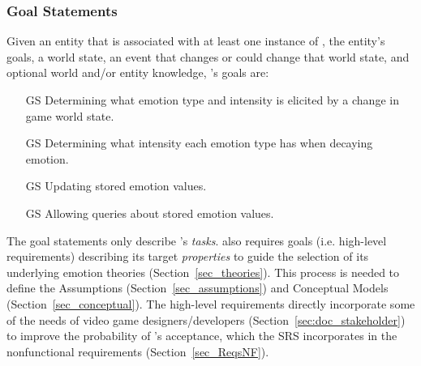 \subsubsection{Goal Statements}\label{sec_goals}
Given an entity that is associated with at least one instance of \progname{},
the entity's goals, a world state, an event that changes or could change that
world state, and optional world and/or entity knowledge, \progname{}'s goals
are:
\begin{itemize}

    \item[GS\refstepcounter{goalnum}\thegoalnum \label{G_EmotionGeneration}]
    Determining what emotion type and intensity is elicited by a change in game
    world state.

    \item[GS\refstepcounter{goalnum}\thegoalnum \label{G_EmotionDecay}]
    Determining what intensity each emotion type has when decaying emotion.

    \item[GS\refstepcounter{goalnum}\thegoalnum \label{G_UpdateEmotionState}]
    Updating stored emotion values.

    \item[GS\refstepcounter{goalnum}\thegoalnum \label{G_QueryEmotionState}]
    Allowing queries about stored emotion values.

\end{itemize}

The goal statements only describe \progname{}'s \textit{tasks}. \progname{}
also requires goals (i.e. high-level requirements) describing its target
\textit{properties} to guide the selection of its underlying emotion theories
(Section~\ref{sec_theories}). This process is needed to define the Assumptions
(Section~\ref{sec_assumptions}) and Conceptual Models
(Section~\ref{sec_conceptual}). The high-level requirements directly
incorporate some of the needs of video game designers/developers
(Section~\ref{sec:doc_stakeholder}) to improve the probability of \progname{}'s
acceptance, which the SRS incorporates in the nonfunctional requirements
(Section~\ref{sec_ReqsNF}).


